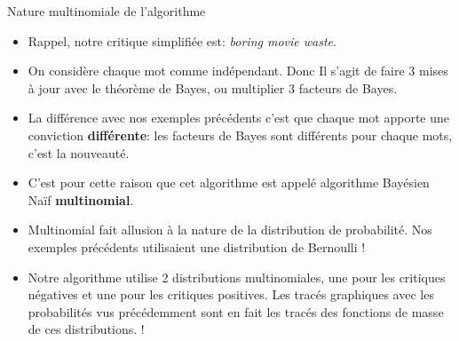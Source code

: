 \begin{frame}{Nature multinomiale de l'algorithme}
	\begin{itemize}
		\item Rappel, notre critique simplifiée est: \textit{boring movie waste}.
		\pause
		\item On considère chaque mot comme indépendant. Donc Il s'agit de faire 3 mises à jour avec le théorème de Bayes, ou multiplier 3 facteurs de Bayes.
		\pause
		\item La différence avec nos exemples précédents c'est que chaque mot apporte une conviction \textbf{différente}: les facteurs de Bayes sont différents pour chaque mots, c'est la nouveauté.
		\pause
		\item C'est pour cette raison que cet algorithme est appelé algorithme Bayésien Naïf \textbf{multinomial}. 
		\pause
		\item Multinomial fait allusion à la nature de la distribution de probabilité. Nos exemples précédents utilisaient une distribution de Bernoulli !
		\pause
		\item Notre algorithme utilise 2 distributions multinomiales, une pour les critiques négatives et une pour les critiques positives. Les tracés graphiques avec les probabilités vus précédemment sont en fait les tracés des fonctions de masse de ces distributions. !
	\end{itemize}
\end{frame}

